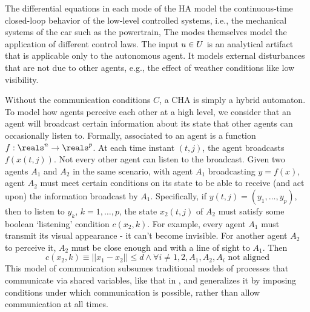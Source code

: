 	
The differential equations in each mode of the HA model the continuous-time closed-loop behavior of the low-level controlled systems, i.e., the mechanical systems of the car such as the powertrain,
The modes themselves model the application of different control laws. 
The input $u \in U$ is an analytical artifact that is applicable only to the autonomous agent.
It models external disturbances that are not due to other agents, e.g., the effect of weather conditions like low visibility. 

Without the communication conditions $C$, a CHA is simply a hybrid automaton.
To model how agents perceive each other at a high level, we consider that an agent will broadcast certain information about its state that other agents can occasionally listen to.
Formally, associated to an agent is a function $f:\reals^n \rightarrow \reals^p$.
At each time instant $(t,j)$, the agent broadcasts $f(x(t,j))$.
Not every other agent can listen to the broadcast.
Given two agents $A_1$ and $A_2$ in the same scenario, with agent $A_1$ broadcasting $y = f(x)$, agent $A_2$ must meet certain conditions on its state to be able to receive (and act upon) the information broadcast by $A_1$.
Specifically, if $y(t,j) = (y_1,\ldots,y_p)$, then to listen to $y_k$, $k=1,\ldots,p$, the state $x_2(t,j)$ of $A_2$ must satisfy some boolean `listening' condition $c(x_2,k)$.
For example, every agent $A_1$ must transmit its visual appearance - it can't become invisible.
For another agent $A_2$ to perceive it, $A_2$ must be close enough and with a line of sight to $A_1$. 
Then 
\[c(x_2,k) \equiv ||x_1 - x_2 || \leq d \land \forall i\neq 1,2, A_1,A_2,A_i \text{ not aligned}\]
This model of communication subsumes traditional models of processes that communicate via shared variables, like that in , and generalizes it by imposing conditions under which communication is possible, rather than allow communication at all times.

